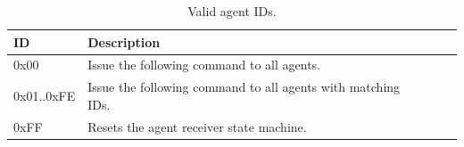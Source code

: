 \documentclass[a4paper]{article}
\begin{document}
\begin{table}[h]
   \centering
   \caption{Valid agent IDs.}
   \label{tab_ids}
   \begin{tabular}{|l|l|l|l|l|l|}
        \hline
        \textbf{ID}  &  \textbf{Description} \\ \hline  
         0x00        &  Issue the following command to all agents.\\ \hline  
         0x01..0xFE  &  Issue the following command to all agents with matching IDs.\\ \hline  
         0xFF        &  Resets the agent receiver state machine. \\ \hline  
   \end{tabular}
\end{table}
\end{document}
